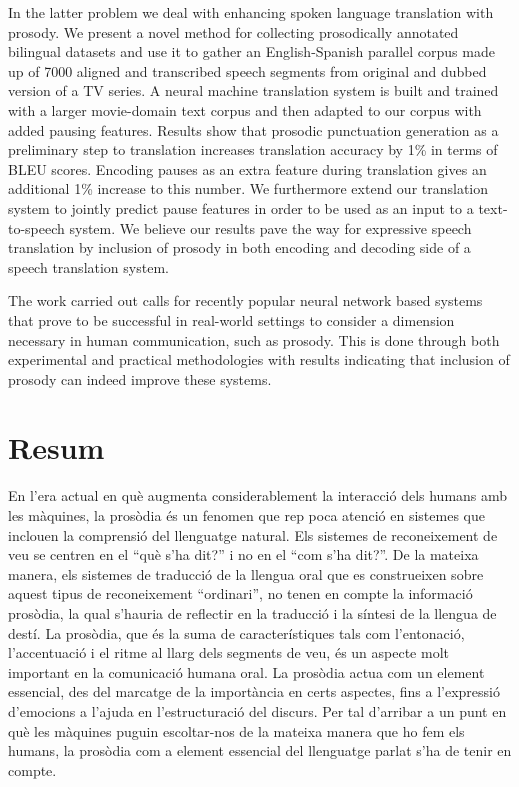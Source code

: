 In the latter problem we deal with enhancing spoken language translation with prosody. We present a novel method for collecting prosodically annotated bilingual datasets and use it to gather an English-Spanish parallel corpus made up of 7000 aligned and transcribed speech segments from original and dubbed version of a TV series. A neural machine translation system is built and trained with a larger movie-domain text corpus and then adapted to our corpus with added pausing features. Results show that prosodic punctuation generation as a preliminary step to translation increases translation accuracy by 1\% in terms of BLEU scores. Encoding pauses as an extra feature during translation gives an additional 1\% increase to this number. We furthermore extend our translation system to jointly predict pause features in order to be used as an input to a text-to-speech system. We believe our results pave the way for expressive speech translation by inclusion of prosody in both encoding and decoding side of a speech translation system. 

The work carried out calls for recently popular neural network based systems that prove to be successful in real-world settings to consider a dimension necessary in human communication, such as prosody. This is done through both experimental and practical methodologies with results indicating that inclusion of prosody can indeed improve these systems.


\vspace*{\fill}
\section*{\Large \sffamily  Resum}

En l’era actual en què augmenta considerablement la interacció dels humans amb les màquines, la prosòdia és un fenomen que rep poca atenció en sistemes que inclouen la comprensió del llenguatge natural. Els sistemes de reconeixement de veu se centren en el ``què s’ha dit?'' i no en el ``com s’ha dit?''. De la mateixa manera, els sistemes de traducció de la llengua oral que es construeixen sobre aquest tipus de reconeixement “ordinari”, no tenen en compte la informació prosòdia, la qual s’hauria de reflectir en la traducció i la síntesi de la llengua de destí. La prosòdia, que és la suma de característiques tals com l’entonació, l’accentuació i el ritme al llarg dels segments de veu, és un aspecte molt important en la comunicació humana oral. La prosòdia actua com un element essencial, des del marcatge de la importància en certs aspectes, fins a l’expressió d’emocions a l’ajuda en l’estructuració del discurs. Per tal d’arribar a un punt en què les màquines puguin escoltar-nos de la mateixa manera que ho fem els humans, la prosòdia com a element essencial del llenguatge parlat s’ha de tenir en compte.


